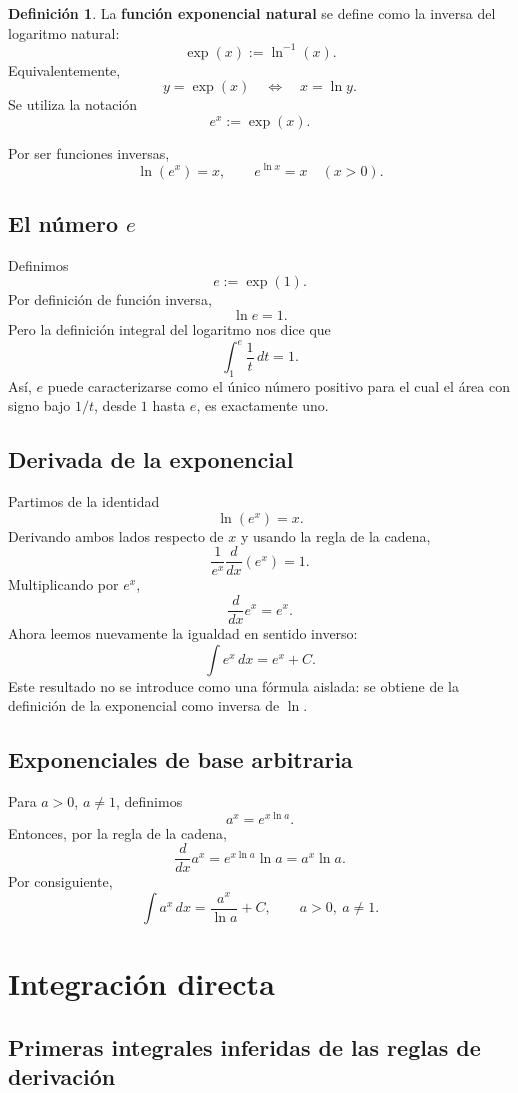 \documentclass[12pt]{article}
\theoremstyle{definition}
\newtheorem{definicion}[teorema]{Definición}
\theoremstyle{remark}
\begin{document}
\begin{definicion}
La \textbf{función exponencial natural} se define como la inversa del logaritmo natural:
\[
\boxed{\exp(x):=\ln^{-1}(x).}
\]
Equivalentemente,
\[
y=\exp(x)\quad\Longleftrightarrow\quad x=\ln y.
\]
Se utiliza la notación
\[
\boxed{e^x:=\exp(x).}
\]
\end{definicion}
Por ser funciones inversas,
\[
\boxed{\ln(e^x)=x,\qquad e^{\ln x}=x\quad(x>0).}
\]

\subsection*{El número $e$}
Definimos
\[
\boxed{e:=\exp(1).}
\]
Por definición de función inversa,
\[
\ln e=1.
\]
Pero la definición integral del logaritmo nos dice que
\[
\boxed{\int_1^e\frac{1}{t}\,dt=1.}
\]
Así, $e$ puede caracterizarse como el único número positivo para el cual el área con signo bajo $1/t$, desde $1$ hasta $e$, es exactamente uno.

\subsection*{Derivada de la exponencial}
Partimos de la identidad
\[
\ln(e^x)=x.
\]
Derivando ambos lados respecto de $x$ y usando la regla de la cadena,
\[
\frac{1}{e^x}\frac{d}{dx}(e^x)=1.
\]
Multiplicando por $e^x$,
\[
\boxed{\frac{d}{dx}e^x=e^x.}
\]
Ahora leemos nuevamente la igualdad en sentido inverso:
\[
\boxed{\int e^x\,dx=e^x+C.}
\]
Este resultado no se introduce como una fórmula aislada: se obtiene de la definición de la exponencial como inversa de $\ln$.

\subsection*{Exponenciales de base arbitraria}
Para $a>0$, $a\neq1$, definimos
\[
a^x=e^{x\ln a}.
\]
Entonces, por la regla de la cadena,
\[
\frac{d}{dx}a^x=e^{x\ln a}\ln a=a^x\ln a.
\]
Por consiguiente,
\[
\boxed{\int a^x\,dx=\frac{a^x}{\ln a}+C,\qquad a>0,\ a\neq1.}
\]

\section{Integración directa}

\subsection*{Primeras integrales inferidas de las reglas de derivación}
\end{document}

